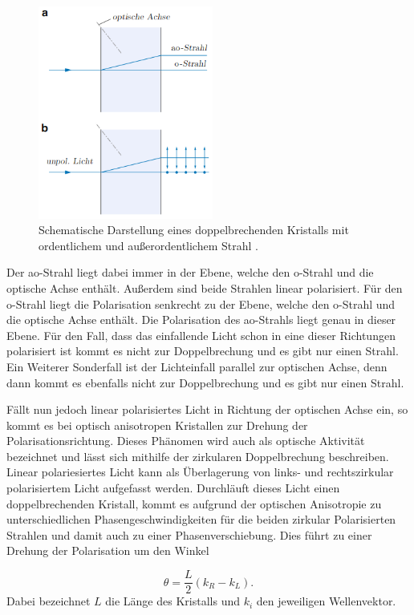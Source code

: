 \begin{figure}[H]
  \centering
  \includegraphics[height=7cm]{Doppelbrechend.png}
  \caption{Schematische Darstellung eines doppelbrechenden Kristalls mit ordentlichem und außerordentlichem Strahl \cite{Heintze}.}
  \label{fig:Doppelbrechend}
\end{figure}

Der ao-Strahl liegt dabei immer in der Ebene, welche den o-Strahl und die
optische Achse enthält. Außerdem sind beide Strahlen linear polarisiert.
Für den o-Strahl liegt die Polarisation senkrecht zu der Ebene, welche den o-Strahl und die
optische Achse enthält. Die Polarisation des ao-Strahls liegt genau in dieser Ebene.
Für den Fall, dass das einfallende Licht schon in eine dieser Richtungen polarisiert ist
kommt es nicht zur Doppelbrechung und es gibt nur einen Strahl.
Ein Weiterer Sonderfall ist der Lichteinfall parallel zur optischen Achse, denn dann
kommt es ebenfalls nicht zur Doppelbrechung und es gibt nur einen Strahl.


Fällt nun jedoch linear polarisiertes Licht in Richtung der optischen Achse ein, so kommt es
bei optisch anisotropen Kristallen zur Drehung der Polarisationsrichtung. Dieses Phänomen wird
auch als optische Aktivität bezeichnet und lässt sich mithilfe der zirkularen Doppelbrechung
beschreiben.
Linear polariesiertes Licht kann als Überlagerung von links- und rechtszirkular
polarisiertem Licht aufgefasst werden. Durchläuft dieses Licht einen doppelbrechenden Kristall, kommt
es aufgrund der optischen Anisotropie zu unterschiedlichen Phasengeschwindigkeiten für die beiden zirkular
Polarisierten Strahlen und damit auch zu einer Phasenverschiebung. Dies führt
zu einer Drehung der Polarisation um den Winkel

\begin{equation}
  \theta=\frac{L}{2}(k_R -k_L).
\end{equation}
Dabei bezeichnet $L$ die Länge des Kristalls und $k_i$ den jeweiligen Wellenvektor.



